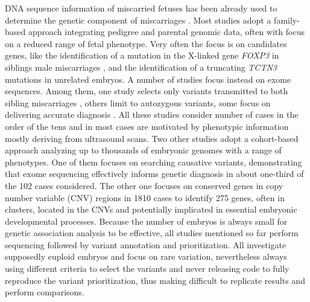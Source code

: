 DNA sequence information of miscarried fetuses has been already used to determine the genetic component of miscarriages \cite{rajcan2020next, filges2015exome}. Most studies adopt a family-based approach integrating pedigree and parental genomic data, often with focus on a reduced range of fetal phenotype\cite{bondeson2017nonsense, dohrn2015ecel1,wilbe2015musk, cristofoli2017novel}. Very often the focus is on candidates genes, like the identification of a mutation in the X-linked gene \textit{FOXP3} in siblings male miscarriages \cite{rae2015novel}, and the identification of a truncating \textit{TCTN3} mutations in unrelated embryos\cite{thomas2012tctn3}. A number of studies focus instead on exome sequences\cite{shamseldin2015identification, qiao2016whole,fu2018whole, meier2019exome, yates2017whole}. Among them, one study selects only variants transmitted to both sibling miscarriages \cite{qiao2016whole}, others limit to autozygous variants\cite{thomas2012tctn3, shamseldin2015identification}, some focus on delivering accurate diagnosis \cite{meier2019exome}. All these studies consider number of cases in the order of the tens and in most cases are motivated by phenotypic information mostly deriving from ultrasound scans. 
Two other studies adopt a cohort-based approach analyzing up to thousands of embryonic genomes with a range of phenotypes\cite{chen2017characterization,zhao2020exome}. One of them focuses on  searching causative variants, demonstrating that exome sequencing effectively informs genetic diagnosis in about one-third of the 102 cases considered\cite{zhao2020exome}. The other one focuses on conserved genes in copy number variable (CNV) regions in 1810 cases to identify 275 genes, often in clusters, located in the CNVs and potentially implicated in essential embryonic developmental processes\cite{chen2017characterization}.
Because the number of embryos is always small for genetic association analysis to be effective, all studies mentioned so far perform sequencing followed by variant annotation and prioritization. All investigate supposedly euploid embryos and focus on rare variation, nevertheless always using different criteria to select the variants and never releasing code to fully reproduce the variant prioritization, thus making difficult to replicate results and perform comparisons.  


